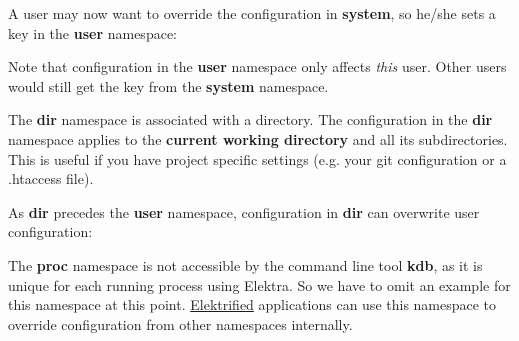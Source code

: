 A user may now want to override the configuration in {\bfseries system}, so he/she sets a key in the {\bfseries user} namespace\+:




Note that configuration in the {\bfseries user} namespace only affects {\itshape this} user. Other users would still get the key from the {\bfseries system} namespace.

The {\bfseries dir} namespace is associated with a directory. The configuration in the {\bfseries dir} namespace applies to the {\bfseries current working directory} and all its subdirectories. This is useful if you have project specific settings (e.\+g. your git configuration or a .htaccess file).

As {\bfseries dir} precedes the {\bfseries user} namespace, configuration in {\bfseries dir} can overwrite user configuration\+:




The {\bfseries proc} namespace is not accessible by the command line tool {\bfseries kdb}, as it is unique for each running process using Elektra. So we have to omit an example for this namespace at this point. \hyperlink{doc_help_elektra-glossary_md}{Elektrified} applications can use this namespace to override configuration from other namespaces internally.

